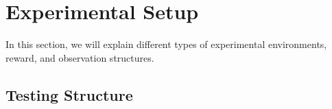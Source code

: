

\chapter{Experimental Setup}\label{chapter:experimental_setup}


In this section, we will explain different types of experimental environments, reward, and observation structures.  















\section{Testing Structure}
